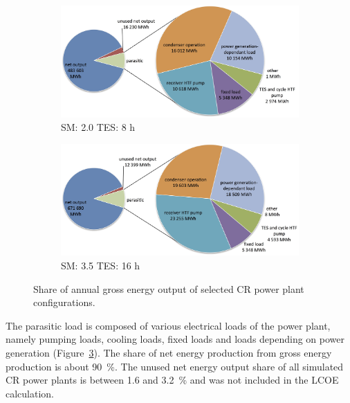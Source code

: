 \begin{figure}[!htbp]
        \centering   
        \begin{subfigure}[b]{0.65\textwidth}
                \centering
                \includegraphics[width=1\textwidth]{FIG/CR_parasitics_low}
                \caption{SM: 2.0 TES: 8 h}\label{CR_parasitics_low}
        \end{subfigure}
\par\medskip %
        \begin{subfigure}[b]{0.65\textwidth}
                \centering
                \includegraphics[width=1\textwidth]{FIG/CR_parasitics_high}
                \caption{SM: 3.5 TES: 16 h}\label{CR_parasitics_high}
        \end{subfigure}
        \caption[Share of annual gross energy output of selected CR power plant configurations.]{Share of annual gross energy output of selected CR power plant configurations.}\label{CR_parasitics}
\end{figure}
The parasitic load is composed of various electrical loads of the power plant, namely pumping loads, cooling loads, fixed loads and loads depending on power generation (Figure~\ref{CR_parasitics}). The share of net energy production from gross energy production is about \SI{90}{\percent}. The unused net energy output share of all simulated CR power plants is between \num{1.6} and \SI{3.2}{\percent} and was not included in the LCOE calculation.

